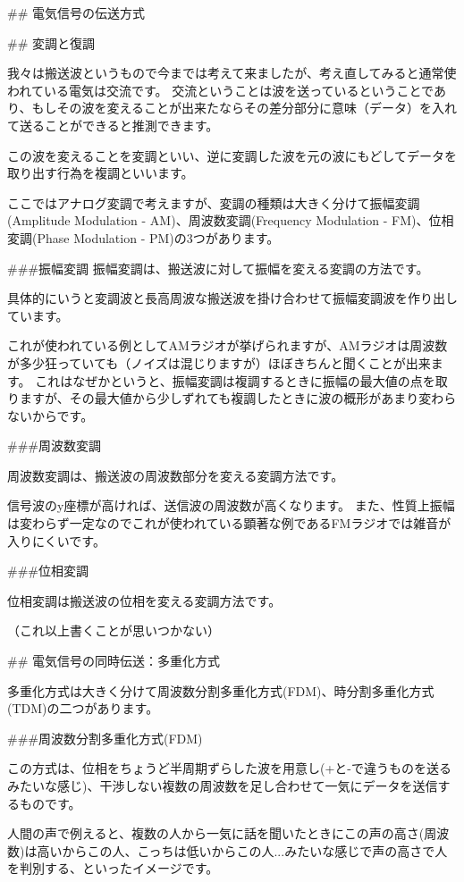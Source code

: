 

## 電気信号の伝送方式

## 変調と復調

我々は搬送波というもので今までは考えて来ましたが、考え直してみると通常使われている電気は交流です。
交流ということは波を送っているということであり、もしその波を変えることが出来たならその差分部分に意味（データ）を入れて送ることができると推測できます。

この波を変えることを変調といい、逆に変調した波を元の波にもどしてデータを取り出す行為を複調といいます。

ここではアナログ変調で考えますが、変調の種類は大きく分けて振幅変調(Amplitude Modulation - AM)、周波数変調(Frequency Modulation - FM)、位相変調(Phase Modulation - PM)の3つがあります。

###振幅変調
振幅変調は、搬送波に対して振幅を変える変調の方法です。

具体的にいうと変調波と長高周波な搬送波を掛け合わせて振幅変調波を作り出しています。

これが使われている例としてAMラジオが挙げられますが、AMラジオは周波数が多少狂っていても（ノイズは混じりますが）ほぼきちんと聞くことが出来ます。
これはなぜかというと、振幅変調は複調するときに振幅の最大値の点を取りますが、その最大値から少しずれても複調したときに波の概形があまり変わらないからです。

###周波数変調

周波数変調は、搬送波の周波数部分を変える変調方法です。

信号波のy座標が高ければ、送信波の周波数が高くなります。
また、性質上振幅は変わらず一定なのでこれが使われている顕著な例であるFMラジオでは雑音が入りにくいです。

###位相変調

位相変調は搬送波の位相を変える変調方法です。

（これ以上書くことが思いつかない）

## 電気信号の同時伝送：多重化方式

多重化方式は大きく分けて周波数分割多重化方式(FDM)、時分割多重化方式(TDM)の二つがあります。

###周波数分割多重化方式(FDM)

この方式は、位相をちょうど半周期ずらした波を用意し(+と-で違うものを送るみたいな感じ)、干渉しない複数の周波数を足し合わせて一気にデータを送信するものです。

人間の声で例えると、複数の人から一気に話を聞いたときにこの声の高さ(周波数)は高いからこの人、こっちは低いからこの人...みたいな感じで声の高さで人を判別する、といったイメージです。

